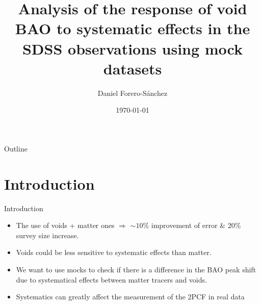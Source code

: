 \documentclass{beamer}
\title[Effects of systematics on void BAO]{Analysis of the response of void BAO to systematic effects in the SDSS observations using mock datasets}
\author{Daniel Forero-S\'anchez\inst{\dag}}
\institute[EPFL] %
{
  \inst{\dag}%
  Laboratory of Astrophysics (LASTRO)\\
  \vspace{5mm}
  École Polytechnyque Fédérale de Lausanne (EPFL)\\
  Lausanne, Suisse
  
  }
\date{\today}
\begin{document}
\begin{frame}
  \titlepage
\end{frame}

\begin{frame}[allowframebreaks]{Outline}
	\begin{multicols}{2}
		\tableofcontents
	\end{multicols}

\end{frame}
\section{Introduction}


\begin{frame}[allowframebreaks]{Introduction}

				\begin{itemize}
					\item The use of voids + matter ones $\Rightarrow$ $\sim10\%$ improvement of error \& 20\% survey size increase.
					\item Voids could be less sensitive to systematic effects than matter.
					\item We want to use mocks to check if there is a difference in the BAO peak shift due to systematical effects between matter tracers and voids.
					\item Systematics can greatly affect the measurement of the 2PCF in real data
				\end{itemize}

\end{frame}
\end{document}
